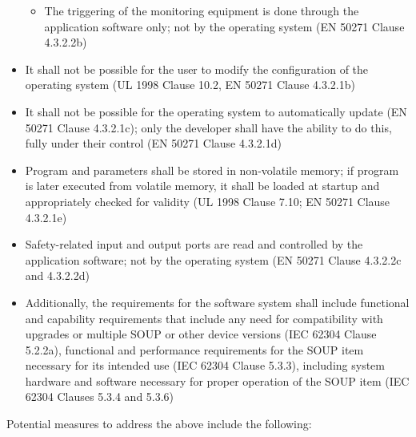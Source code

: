 \documentclass[12pt]{../Common_files/ElisaPaper}
\begin{document}
\begin{itemize}
\begin{itemize}
\item The triggering of the monitoring equipment is done through the application software only; not by the operating system (EN 50271 \cite{EN50271} Clause 4.3.2.2b)

\end{itemize}

\item It shall not be possible for the user to modify the configuration of the operating system (UL 1998 \cite{UL1998} Clause 10.2, EN 50271 \cite{EN50271} Clause 4.3.2.1b)

\item It shall not be possible for the operating system to automatically update (EN 50271 \cite{EN50271} Clause 4.3.2.1c); only the developer shall have the ability to do this, fully under their control  (EN 50271 \cite{EN50271} Clause 4.3.2.1d)

\item Program and parameters shall be stored in non-volatile memory; if program is later executed from volatile memory, it shall be loaded at startup and appropriately checked for validity (UL 1998 \cite{UL1998} Clause 7.10; EN 50271 \cite{EN50271} Clause 4.3.2.1e)

\item Safety-related input and output ports are read and controlled by the application software; not by the operating system  (EN 50271 \cite{EN50271} Clause 4.3.2.2c and 4.3.2.2d)

\item Additionally, the requirements for the software system shall include functional and capability requirements that include any need for compatibility with upgrades or multiple SOUP or other device versions (IEC 62304 \cite{IEC62304} Clause 5.2.2a), functional and performance requirements for the SOUP item necessary for its intended use (IEC 62304 \cite{IEC62304} Clause 5.3.3), including system hardware and software necessary for proper operation of the SOUP item (IEC 62304 \cite{IEC62304} Clauses 5.3.4 and 5.3.6)

\end{itemize}

Potential measures to address the above include the following:
\end{document}
